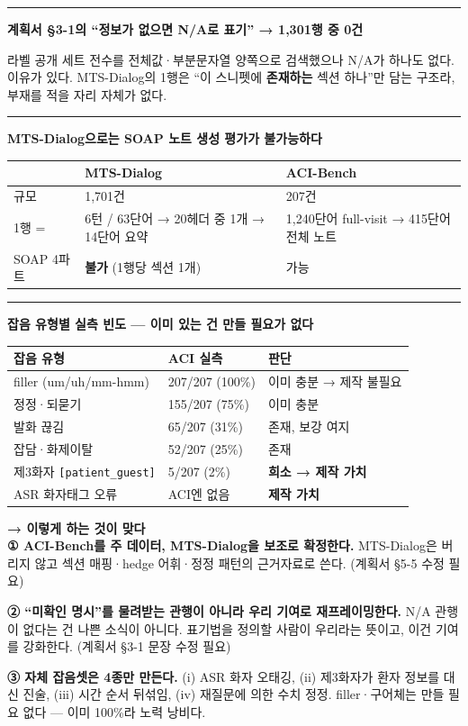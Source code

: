 \documentclass[10.5pt,a4paper]{article}
\renewcommand{\emph}[1]{{\color{muted}#1}}
\newcommand{\finding}[1]{%
\par\vspace{0.9em}\noindent
\textcolor{navy}{\rule[-0.05em]{2.4pt}{0.82em}}\hspace{0.55em}\textbf{#1}\par\nobreak\vspace{0.15em}}
\newcommand{\proposal}[1]{%
\begin{tcolorbox}[enhanced, breakable, colback=softgray, boxrule=0pt, frame hidden,
  borderline west={3pt}{0pt}{navy}, arc=0pt,
  left=12pt, right=10pt, top=8pt, bottom=8pt, before skip=12pt, after skip=8pt,
  before upper={\setlength{\parskip}{0.7em}\setlength{\parindent}{0pt}}]
{\bfseries\color{navy}→ 이렇게 하는 것이 맞다}\\[3pt]#1
\end{tcolorbox}}
\newcommand{\hl}[1]{\textbf{\color{accent}#1}}
\newcommand{\subhead}[1]{\par\vspace{1.0em}{\bfseries\color{navy}#1}\par\vspace{-0.15em}}
\begin{document}
\subhead{확인된 사실}

\finding{계획서 §3-1의 ``정보가 없으면 N/A로 표기'' → \hl{1,301행 중 0건}}

라벨 공개 세트 전수를 전체값·부분문자열 양쪽으로 검색했으나 N/A가 하나도 없다. 이유가 있다. MTS-Dialog의 1행은 ``이 스니펫에 \textbf{존재하는} 섹션 하나''만 담는 구조라, 부재를 적을 자리 자체가 없다.

\finding{MTS-Dialog으로는 SOAP 노트 생성 평가가 불가능하다}

\begin{center}\small
\begin{tabular}{@{}lp{4.3cm}p{3.7cm}@{}}
\toprule
 & \textbf{MTS-Dialog} & \textbf{ACI-Bench} \\
\midrule
규모 & 1,701건 & 207건 \\
1행 = & 6턴 / 63단어 → 20헤더 중 1개 → 14단어 요약 & 1,240단어 full-visit → 415단어 전체 노트 \\
SOAP 4파트 & \hl{불가} \newline (1행당 섹션 1개) & 가능 \\
\bottomrule
\end{tabular}
\end{center}

\finding{잡음 유형별 실측 빈도 — 이미 있는 건 만들 필요가 없다}

\begin{center}\small
\begin{tabular}{@{}lll@{}}
\toprule
\textbf{잡음 유형} & \textbf{ACI 실측} & \textbf{판단} \\
\midrule
filler (um/uh/mm-hmm) & 207/207 (100\%) & 이미 충분 → 제작 불필요 \\
정정·되묻기 & 155/207 (75\%) & 이미 충분 \\
발화 끊김 & 65/207 (31\%) & 존재, 보강 여지 \\
잡담·화제이탈 & 52/207 (25\%) & 존재 \\
제3화자 \texttt{[patient\_guest]} & 5/207 (2\%) & \hl{희소 → 제작 가치} \\
ASR 화자태그 오류 & ACI엔 없음 & \hl{제작 가치} \\
\bottomrule
\end{tabular}
\end{center}

\proposal{
\textbf{① ACI-Bench를 주 데이터, MTS-Dialog을 보조로 확정한다.}
MTS-Dialog은 버리지 않고 섹션 매핑·hedge 어휘·정정 패턴의 근거자료로 쓴다. \emph{(계획서 §5-5 수정 필요)}

\textbf{② ``미확인 명시''를 물려받는 관행이 아니라 우리 기여로 재프레이밍한다.}
N/A 관행이 없다는 건 나쁜 소식이 아니다. 표기법을 정의할 사람이 우리라는 뜻이고, 이건 기여를 강화한다. \emph{(계획서 §3-1 문장 수정 필요)}

\textbf{③ 자체 잡음셋은 4종만 만든다.}
(i) ASR 화자 오태깅, (ii) 제3화자가 환자 정보를 대신 진술, (iii) 시간 순서 뒤섞임, (iv) 재질문에 의한 수치 정정.
filler·구어체는 만들 필요 없다 — 이미 100\%라 노력 낭비다.
}
\end{document}
